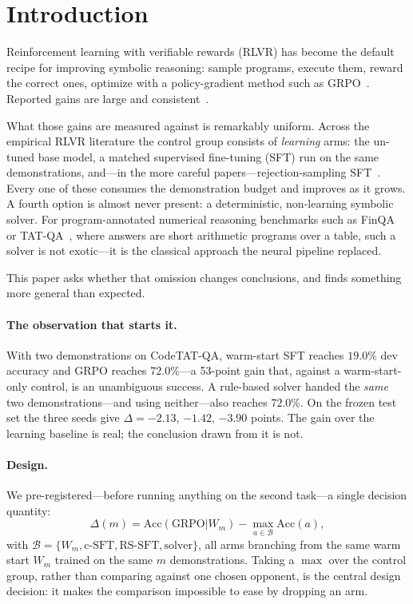 \section{Introduction}

Reinforcement learning with verifiable rewards (RLVR) has become the default
recipe for improving symbolic reasoning: sample programs, execute them, reward
the correct ones, optimize with a policy-gradient method such as
GRPO~\cite{grpo2024}. Reported gains are large and consistent~\cite{deepseekr1}.

What those gains are measured against is remarkably uniform. Across the
empirical RLVR literature the control group consists of \emph{learning} arms:
the un-tuned base model, a matched supervised fine-tuning (SFT) run on the same
demonstrations, and---in the more careful papers---rejection-sampling
SFT~\cite{rft2023,restem2023}. Every one of these consumes the demonstration
budget and improves as it grows. A fourth option is almost never present: a
deterministic, non-learning symbolic solver. For program-annotated numerical
reasoning benchmarks such as FinQA~\cite{finqa2021} or
TAT-QA~\cite{tatqa2021}, where answers are short arithmetic programs over a
table, such a solver is not exotic---it is the classical approach the neural
pipeline replaced.

This paper asks whether that omission changes conclusions, and finds something
more general than expected.

\paragraph{The observation that starts it.}
With two demonstrations on CodeTAT-QA, warm-start SFT reaches $19.0\%$ dev
accuracy and GRPO reaches $72.0\%$---a 53-point gain that, against a
warm-start-only control, is an unambiguous success. A rule-based solver handed
the \emph{same} two demonstrations---and using neither---also reaches $72.0\%$.
On the frozen test
set the three seeds give $\Delta = -2.13$, $-1.42$, $-3.90$ points. The gain
over the learning baseline is real; the conclusion drawn from it is not.

\paragraph{Design.}
We pre-registered---before running anything on the second task---a single
decision quantity:
\begin{equation}
\label{eq:delta}
\Delta(m) = \mathrm{Acc}(\mathrm{GRPO}|W_m) - \max_{a \in \mathcal{B}} \mathrm{Acc}(a),
\end{equation}
with $\mathcal{B} = \{W_m, \text{c-SFT}, \text{RS-SFT}, \text{solver}\}$, all
arms branching from the same warm start $W_m$ trained on the same $m$
demonstrations. Taking a $\max$ over the control group, rather than comparing
against one chosen opponent, is the central design decision: it makes the
comparison impossible to ease by dropping an arm.

